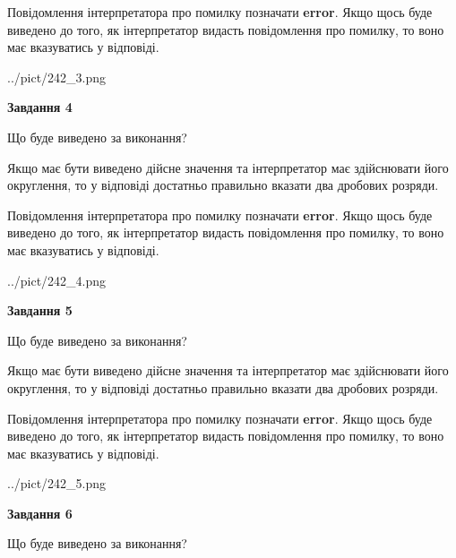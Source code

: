 \documentclass[12pt, ukrainian]{article}
\begin{document}
{\begin {Large}
Повідомлення інтерпретатора про помилку позначати \textbf{error}.
Якщо щось буде виведено до того, як інтерпретатор видасть повідомлення про помилку, 
то воно має вказуватись у відповіді. \par

\begin{center}
	{../pict/242_3.png}
\end{center}
\newpage

{\begin {center}\textbf{Завдання 4}\end {center}}\par
Що буде виведено за виконання? \par

Якщо має бути виведено дійсне значення та інтерпретатор має здійснювати його округлення, 
то у відповіді достатньо правильно вказати два дробових розряди.

Повідомлення інтерпретатора про помилку позначати \textbf{error}.
Якщо щось буде виведено до того, як інтерпретатор видасть повідомлення про помилку, 
то воно має вказуватись у відповіді. \par

\begin{center}
	{../pict/242_4.png}
\end{center}
\newpage

{\begin {center}\textbf{Завдання 5}\end {center}}\par
Що буде виведено за виконання? \par

Якщо має бути виведено дійсне значення та інтерпретатор має здійснювати його округлення, 
то у відповіді достатньо правильно вказати два дробових розряди.

Повідомлення інтерпретатора про помилку позначати \textbf{error}.
Якщо щось буде виведено до того, як інтерпретатор видасть повідомлення про помилку, 
то воно має вказуватись у відповіді. \par

\begin{center}
	{../pict/242_5.png}
\end{center}
\newpage

{\begin {center}\textbf{Завдання 6}\end {center}}\par
Що буде виведено за виконання? \par


\end{Large}}
\end{document}
